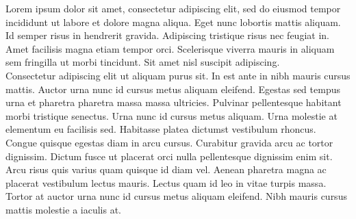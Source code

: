 {
\setlength{\columnsep}{30pt}
\begin{multicols*}{2}
{
    Lorem ipsum dolor sit amet, consectetur adipiscing elit, sed do eiusmod tempor incididunt ut labore et dolore magna aliqua. Eget nunc lobortis mattis aliquam. Id semper risus in hendrerit gravida. Adipiscing tristique risus nec feugiat in. Amet facilisis magna etiam tempor orci. Scelerisque viverra mauris in aliquam sem fringilla ut morbi tincidunt. Sit amet nisl suscipit adipiscing.\\
    Consectetur adipiscing elit ut aliquam purus sit. In est ante in nibh mauris cursus mattis. Auctor urna nunc id cursus metus aliquam eleifend. Egestas sed tempus urna et pharetra pharetra massa massa ultricies. Pulvinar pellentesque habitant morbi tristique senectus. Urna nunc id cursus metus aliquam. Urna molestie at elementum eu facilisis sed. Habitasse platea dictumst vestibulum rhoncus.
}
\pagebreak
{
    Congue quisque egestas diam in arcu cursus. Curabitur gravida arcu ac tortor dignissim. Dictum fusce ut placerat orci nulla pellentesque dignissim enim sit. Arcu risus quis varius quam quisque id diam vel. Aenean pharetra magna ac placerat vestibulum lectus mauris. Lectus quam id leo in vitae turpis massa. Tortor at auctor urna nunc id cursus metus aliquam eleifend. Nibh mauris cursus mattis molestie a iaculis at.
}
\end{multicols*}
}

